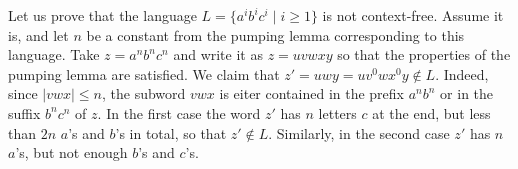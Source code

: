 

\setcounter{section}{7}
\setcounter{subsection}{2}
\setcounter{dfn}{4}

\begin{exl}
Let us prove that the language $L = \{a^ib^ic^i \mid i \ge 1\}$ is not context-free.
Assume it is, and let $n$ be a constant from the pumping lemma corresponding to this language.
Take $z = a^nb^nc^n$ and write it as $z = uvwxy$ so that the properties of the pumping lemma are satisfied.
We claim that $z' = uwy = uv^0wx^0y \notin L$.
Indeed, since $|vwx| \le n$, the subword $vwx$ is eiter contained in the prefix $a^nb^n$ or in the suffix $b^nc^n$ of $z$.
In the first case the word $z'$ has $n$ letters $c$ at the end, but less than $2n$ $a$'s and $b$'s in total, so that $z' \notin L$.
Similarly, in the second case $z'$ has $n$ $a$'s, but not enough $b$'s and $c$'s.
\end{exl}

